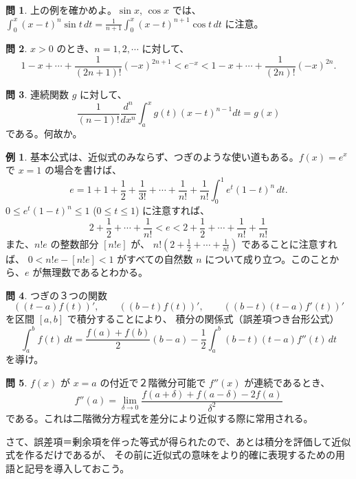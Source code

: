 \documentclass[a4paper]{jsarticle}
\theoremstyle{definition}
\newtheorem{Example}[Theorem]{例}
\newtheorem{Exercise}{問}%
\theoremstyle{remark}
\begin{document}
\begin{Exercise}
  上の例を確かめよ。$\sin x$, $\cos x$ では、
  $\int_0^x (x-t)^n\sin t\, dt = \frac{1}{n+1} \int_0^x (x-t)^{n+1} \cos t\, dt$ に注意。
\end{Exercise} 

\begin{Exercise}
  $x>0$ のとき、$n=1,2,\cdots$ に対して、
  \[
    1 - x + \cdots + \frac{1}{(2n+1)!} (-x)^{2n+1} < e^{-x} < 1 - x + \cdots + \frac{1}{(2n)!} (-x)^{2n}.
  \]
\end{Exercise}

\begin{Exercise}
連続関数 $g$ に対して、
\[
\frac{1}{(n-1)!}
\frac{d^{n}}{dx^{n}}
\int_a^x g(t)(x-t)^{n-1} dt = g(x)
\]
である。何故か。
\end{Exercise}

\begin{Example}
基本公式は、近似式のみならず、つぎのような使い道もある。$f(x) = e^x$ で $x=1$ の場合を書けば、
\[ 
e = 1 + 1 + \frac{1}{2} + \frac{1}{3!} + \cdots + \frac{1}{n!} 
+ \frac{1}{n!} \int_0^1 e^t(1-t)^n\, dt. 
\]
$0 \leq e^t(1-t)^n \leq 1$ ($0 \leq t \leq 1$) に注意すれば、
\[ 
2 + \frac{1}{2} + \cdots + \frac{1}{n!} < e < 2 + \frac{1}{2} + \cdots + \frac{1}{n!} + \frac{1}{n!}
\] 
また、$n!e$ の整数部分 $[n!e]$ が、
$n!(2+ \frac{1}{2} + \cdots + \frac{1}{n!})$ であることに注意すれば、
$0 < n!e - [n!e] < 1$ がすべての自然数 $n$ について成り立つ。このことから、$e$ が無理数であるとわかる。
\end{Example} 

\begin{Exercise}
つぎの３つの関数
\[
((t-a)f(t))',
\qquad
((b-t)f(t))',
\qquad
((b-t)(t-a)f'(t))'
\]
を区間 $[a,b]$ で積分することにより、
積分の関係式（誤差項つき台形公式）
\[
\int_a^b f(t)\,dt = \frac{f(a) + f(b)}{2} (b-a)
- \frac{1}{2} \int_a^b (b-t)(t-a) f''(t)\,dt
\]
を導け。
\end{Exercise}

\begin{Exercise}
  $f(x)$ が $x=a$ の付近で２階微分可能で $f''(x)$ が連続であるとき、
  \[
    f''(a) = \lim_{\delta \to 0} \frac{f(a+\delta) + f(a-\delta) - 2f(a)}{\delta^2}
  \]
  である。これは二階微分方程式を差分により近似する際に常用される。
\end{Exercise}

さて、誤差項＝剰余項を伴った等式が得られたので、あとは積分を評価して近似式を作るだけであるが、
その前に近似式の意味をより的確に表現するための用語と記号を導入しておこう。
\end{document}
